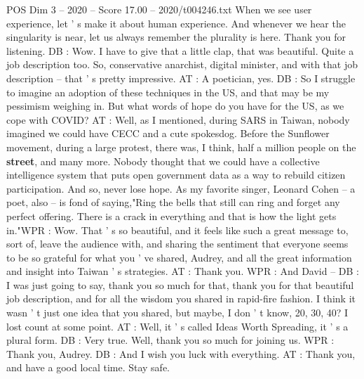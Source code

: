 \begin{textsample}{POS Dim 3 – 2020 – Score 17.00 – 2020/t004246.txt}
When we see user experience, let ' s make it about human experience.
And whenever we hear the singularity is near, let us always remember the plurality is here.
Thank you for listening.
DB : Wow.
I have to give that a little clap, that was beautiful.
Quite a job description too.
So, conservative anarchist, digital minister, and with that job description -- that ' s pretty impressive.
AT : A poetician, yes.
DB : So I struggle to imagine an adoption of these techniques in the US, and that may be my pessimism weighing in.
But what words of hope do you have for the US, as we cope with COVID?
AT : Well, as I mentioned, during SARS in Taiwan, nobody imagined we could have CECC and a cute spokesdog.
Before the Sunflower movement, during a large protest, there was, I think, half a million people on the \textbf{street}, and many more.
Nobody thought that we could have a collective intelligence system that puts open government data as a way to rebuild citizen participation.
And so, never lose hope.
As my favorite singer, Leonard Cohen -- a poet, also -- is fond of saying,"Ring the bells that still can ring and forget any perfect offering.
There is a crack in everything and that is how the light gets in."WPR : Wow.
That ' s so beautiful, and it feels like such a great message to, sort of, leave the audience with, and sharing the sentiment that everyone seems to be so grateful for what you ' ve shared, Audrey, and all the great information and insight into Taiwan ' s strategies.
AT : Thank you.
WPR : And David -- DB : I was just going to say, thank you so much for that, thank you for that beautiful job description, and for all the wisdom you shared in rapid-fire fashion.
I think it wasn ' t just one idea that you shared, but maybe, I don ' t know, 20, 30, 40?
I lost count at some point.
AT : Well, it ' s called Ideas Worth Spreading, it ' s a plural form.
DB : Very true.
Well, thank you so much for joining us.
WPR : Thank you, Audrey.
DB : And I wish you luck with everything.
AT : Thank you, and have a good local time.
Stay safe.

\end{textsample}
